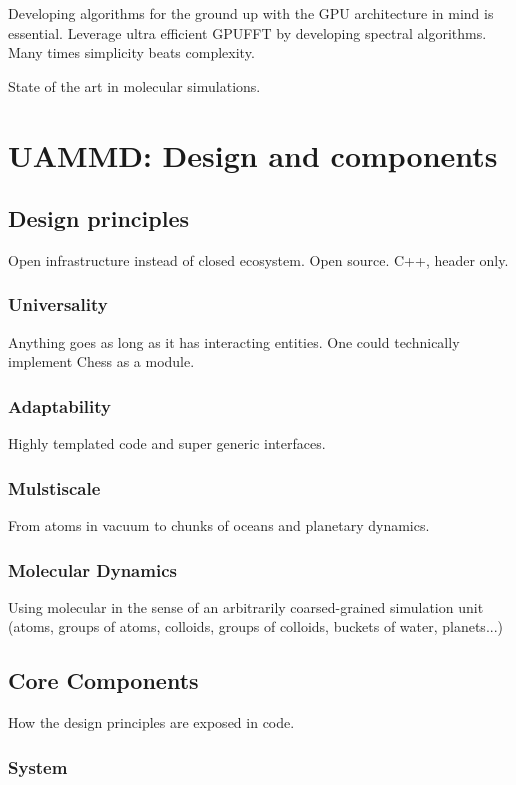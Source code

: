 \documentclass[ twoside,openright,titlepage,numbers=noenddot,%
headinclude,footinclude,cleardoublepage=empty,abstract=on,
BCOR=5mm,paper=a4,fontsize=11pt, dvipsnames
]{scrreprt}
\newcommand{\gpu}{\gls{GPU}\xspace}
\begin{document}
Developing algorithms for the ground up with the GPU architecture in mind is essential. Leverage ultra efficient \gpu \gls{FFT} by developing spectral algorithms. Many times simplicity beats complexity.

State of the art in molecular simulations.

\cleardoublepage
{}
\part{UAMMD: Design and components}\label{pt:uammd}
\chapter{Design principles}\label{ch:design}
Open infrastructure instead of closed ecosystem. Open source. C++, header only.
\section{Universality}
Anything goes as long as it has interacting entities. One could technically implement Chess as a module.
\section{Adaptability}
Highly templated code and super generic interfaces. 
\section{Mulstiscale}
From atoms in vacuum to chunks of oceans and planetary dynamics.
\section{Molecular Dynamics}
Using molecular in the sense of an arbitrarily coarsed-grained simulation unit (atoms, groups of atoms, colloids, groups of colloids, buckets of water, planets...)

\chapter{Core Components}\label{ch:core}
How the design principles are exposed in code. 
\section{System}
\end{document}
